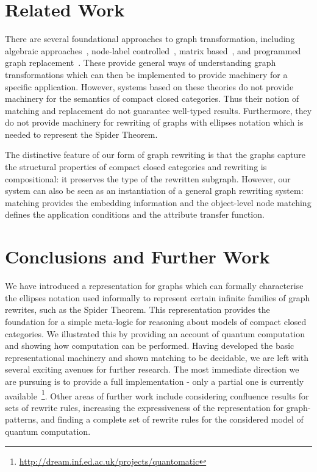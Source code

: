 \documentclass[runningheads]{llncs}
\begin{document}
\section{Related Work}
\label{sec:relatedwork}

There are several foundational approaches to graph transformation,
including algebraic approaches~\cite{corradini97algebraic}, node-label
controlled~\cite{Graphgrammars83}, matrix
based~\cite{DBLP:conf/gg/VelascoL06}, and programmed graph
replacement~\cite{progress97}. These provide general ways of
understanding graph transformations which can then be implemented to
provide machinery for a specific application.  However, systems based
on these theories do not provide machinery for the semantics of
compact closed categories. Thus their notion of matching and
replacement do not guarantee well-typed results. Furthermore, they do
not provide machinery for rewriting of graphs with ellipses notation
which is needed to represent the Spider Theorem.

The distinctive feature of our form of graph rewriting is that the
graphs capture the structural properties of compact closed categories
and rewriting is compositional: it preserves the type of the rewritten
subgraph. However, our system can also be seen as an instantiation of
a general graph rewriting system: matching provides the embedding
information and the object-level node matching defines the application
conditions and the attribute transfer function.


\section{Conclusions and Further Work}
\label{sec:conclusions}

We have introduced a representation for graphs which can formally
characterise the ellipses notation used informally to represent
certain infinite families of graph rewrites, such as the Spider
Theorem.  This representation provides the foundation for a simple
meta-logic for reasoning about models of compact closed categories. We
illustrated this by providing an account of quantum computation and
showing how computation can be performed. Having developed the basic
representational machinery and shown matching to be decidable, we are
left with several exciting avenues for further research.  The most
immediate direction we are pursuing is to provide a full
implementation - only a partial one is currently
available~\footnote{\url{http://dream.inf.ed.ac.uk/projects/quantomatic}}.
Other areas of further work include considering confluence results for
sets of rewrite rules, increasing the expressiveness of the
representation for graph-patterns, and finding a complete set of
rewrite rules for the considered model of quantum computation.
\end{document}

